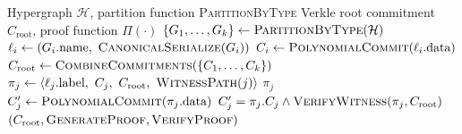 \documentclass[11pt,a4paper]{article}
\begin{document}
\begin{algorithm}[H]
\caption{Verkle Tree Construction and Proof Generation}
\label{alg:verkle_tree}
\begin{algorithmic}[1]
\REQUIRE Hypergraph $\mathcal{H}$, partition function \textsc{PartitionByType}
\ENSURE Verkle root commitment $C_{\text{root}}$, proof function $\Pi(\cdot)$
\STATE {}
\STATE $\{G_1, \ldots, G_k\} \leftarrow \textsc{PartitionByType}(\mathcal{H})$
    \STATE $\ell_i \leftarrow (G_i.\text{name},\ \textsc{CanonicalSerialize}(G_i))$
\ENDFOR
\STATE {}
    \STATE $C_i \leftarrow \textsc{PolynomialCommit}(\ell_i.\text{data})$
\ENDFOR
\STATE $C_{\text{root}} \leftarrow \textsc{CombineCommitments}(\{C_1, \ldots, C_k\})$
\STATE {}
    \STATE $\pi_j \leftarrow \langle \ell_j.\text{label},\ C_j,\ C_{\text{root}},\ \textsc{WitnessPath}(j) \rangle$
    \RETURN $\pi_j$ \quad {}
\ENDFUNCTION
\STATE {}
    \STATE $C_j' \leftarrow \textsc{PolynomialCommit}(\pi_j.\text{data})$
    \RETURN $C_j' = \pi_j.C_j \wedge \textsc{VerifyWitness}(\pi_j, C_{\text{root}})$
\ENDFUNCTION
\RETURN $(C_{\text{root}}, \textsc{GenerateProof}, \textsc{VerifyProof})$
\end{algorithmic}
\end{algorithm}
\end{document}
